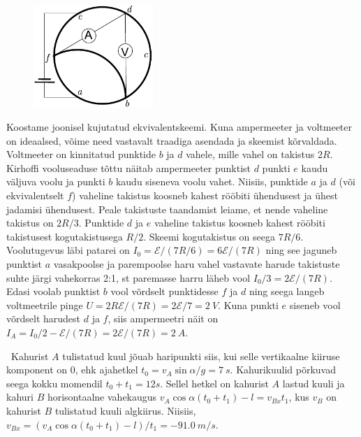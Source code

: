 \documentclass[10pt]{article}
\begin{document}

\solu
\begin{figure}
	\vspace{-20pt}
	\begin{center}
		\includegraphics[width = 0.4\textwidth]{2018-lahg-03-yl.pdf}
	\end{center}
\end{figure}

Koostame joonisel kujutatud ekvivalentskeemi. Kuna ampermeeter ja voltmeeter on ideaalsed, võime need vastavalt traadiga asendada ja skeemist kõrvaldada. Voltmeeter on kinnitatud punktide $b$ ja $d$ vahele, mille vahel on takistus $2R$. Kirhoffi vooluseaduse tõttu näitab ampermeeter punktist $d$ punkti $e$ kaudu väljuva voolu ja punkti $b$ kaudu siseneva voolu vahet. Niisiis, punktide $a$ ja $d$ (või ekvivalentselt $f$) vaheline takistus koosneb kahest rööbiti ühendusest ja ühest jadamisi ühendusest. Peale takistuste taandamist leiame, et nende vaheline takistus on $2R/3$. Punktide $d$ ja $e$ vaheline takistus koosneb kahest rööbiti takistusest kogutakistusega $R/2$. Skeemi kogutakistus on seega $7R/6$. Voolutugevus läbi patarei on $I_0 = \mathcal{E}/(7R/6) = 6\mathcal{E}/(7R)$ ning see jaguneb punktist $a$ vasakpoolse ja parempoolse haru vahel vastavate harude takistuste suhte järgi vahekorras 2:1, st paremasse harru läheb vool $I_0/3 = 2\mathcal{E}/(7R)$. Edasi voolab punktist $b$ vool võrdselt punktidesse $f$ ja $d$ ning seega langeb voltmeetrile pinge $U = 2R\mathcal{E}/(7R) = 2\mathcal{E}/7=\SI{2}{V}$. Kuna punkti $e$ siseneb vool võrdselt harudest $d$ ja $f$, siis ampermeetri näit on $I_A = I_0/2 - \mathcal{E}/(7R) = 2\mathcal{E}/(7R) = \SI{2}{A}$.
\probend
\bigskip


\solu
\
Kahurist $A$ tulistatud kuul jõuab haripunkti siis, kui selle vertikaalne kiiruse komponent on $0$, ehk ajahetkel $t_0 = v_A\sin\alpha/g = \SI{7}{s}$. Kahurikuulid põrkuvad seega kokku momendil $t_0 + t_1 = \SI{12}s$. Sellel hetkel on kahurist $A$ lastud kuuli ja kahuri $B$ horisontaalne vahekaugus $v_A\cos\alpha(t_0 + t_1) - l = v_{Bx}t_1$, kus $v_B$ on kahurist $B$ tulistatud kuuli algkiirus. Niisiis, $v_{Bx} = (v_A\cos\alpha(t_0 + t_1) - l)/t_1 = \SI{-91.0}{m/s}$.
\end{document}
